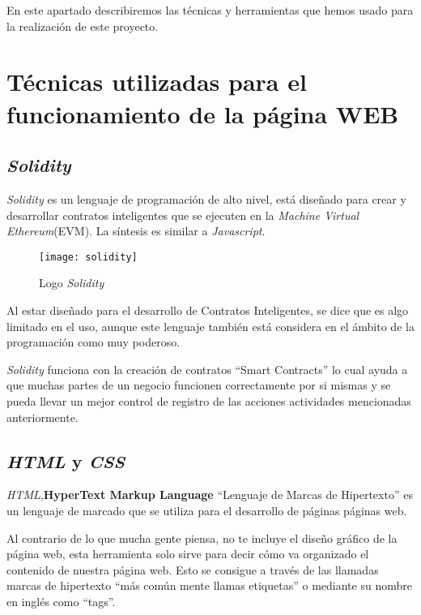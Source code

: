 
En este apartado describiremos las técnicas y herramientas
que hemos usado para la realización de este proyecto.

\section{Técnicas utilizadas para el funcionamiento de la página WEB}

\subsection{\textit{Solidity}}

\textit{Solidity}\cite{solidity}\cite{solidity1}\cite{solidity2} es un lenguaje de programación de alto nivel, está diseñado para crear y desarrollar contratos inteligentes que se ejecuten en la \textit{Machine Virtual Ethereum}(EVM). La síntesis es similar a \textit{Javascript}.

\begin{wrapfigure}{r}{0.4\linewidth}
    \centering
    \texttt{[image: solidity]}
    \caption{Logo \textit{Solidity}}
\end{wrapfigure}

Al estar diseñado para el desarrollo de Contratos Inteligentes, se dice que es algo limitado en el uso, aunque este lenguaje también está considera en el ámbito de la programación como muy poderoso.

\textit{Solidity} funciona con la creación de contratos ``Smart Contracts'' lo cual ayuda a que muchas partes de un negocio funcionen correctamente por si mismas y se pueda llevar un mejor control de registro de las acciones actividades mencionadas anteriormente.\\

\subsection{\textit{HTML} y \textit{CSS}}

\textit{HTML}\cite{html},\textbf{HyperText Markup Language} ``Lenguaje de Marcas de Hipertexto'' es un lenguaje de marcado que se utiliza para el desarrollo de páginas páginas web.

Al contrario de lo que mucha gente piensa, no te incluye el diseño gráfico de la página web, esta herramienta solo sirve para decir cómo va organizado el contenido de nuestra página web. Esto se consigue a través de las llamadas marcas de hipertexto ``más común mente llamas etiquetas'' o mediante su nombre en inglés como ``tags''.

